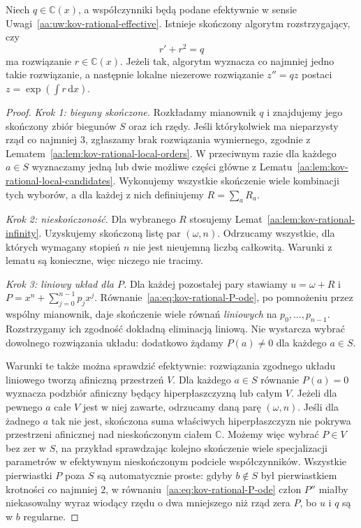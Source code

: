 \begin{twierdzenie}
\label{aa:tw:kov-rational-complete-algorithm}
Niech $q\in\mathbb C(x)$,
a współczynniki będą podane
efektywnie w sensie
Uwagi~\ref{aa:uw:kov-rational-effective}.
Istnieje skończony algorytm
rozstrzygający, czy
\begin{equation}\label{aa:eq:kov-rational-main-riccati}
 r'+r^2=q
\end{equation}
ma rozwiązanie $r\in\mathbb C(x)$.
Jeżeli tak, algorytm
wyznacza co najmniej jedno
takie rozwiązanie, a następnie
lokalne niezerowe rozwiązanie
$z''=qz$ postaci
$z=\exp(\int r\,\mathrm dx)$.
\end{twierdzenie}
\begin{proof}
\emph{Krok 1: bieguny skończone.}
Rozkładamy mianownik $q$
i znajdujemy jego skończony
zbiór biegunów $S$
oraz ich rzędy.
Jeśli którykolwiek ma
nieparzysty rząd co najmniej
$3$, zgłaszamy
brak rozwiązania wymiernego,
zgodnie z
Lematem~\ref{aa:lem:kov-rational-local-orders}.
W przeciwnym razie dla
każdego $a\in S$ wyznaczamy
jedną lub dwie możliwe
części główne z
Lematu~\ref{aa:lem:kov-rational-local-candidates}.
Wykonujemy wszystkie skończenie
wiele kombinacji tych wyborów,
a dla każdej z nich
definiujemy $R=\sum_aR_a$.

\emph{Krok 2: nieskończoność.}
Dla wybranego $R$
stosujemy
Lemat~\ref{aa:lem:kov-rational-infinity}.
Uzyskujemy skończoną listę
par $(\omega,n)$.
Odrzucamy wszystkie,
dla których wymagany
stopień $n$ nie jest
nieujemną liczbą całkowitą.
Warunki z lematu są konieczne,
więc niczego nie tracimy.

\emph{Krok 3: liniowy układ dla $P$.}
Dla każdej pozostałej pary
stawiamy $u=\omega+R$ i
$P=x^n+\sum_{j=0}^{n-1}p_jx^j$.
Równanie~\eqref{aa:eq:kov-rational-P-ode},
po pomnożeniu przez
wspólny mianownik,
daje skończenie wiele równań
\emph{liniowych} na
$p_0,\ldots,p_{n-1}$.
Rozstrzygamy ich zgodność
dokładną eliminacją liniową.
Nie wystarcza wybrać
dowolnego rozwiązania
układu: dodatkowo żądamy
$P(a)\ne0$ dla każdego
$a\in S$.

Warunki te także
można sprawdzić efektywnie:
rozwiązania zgodnego
układu liniowego tworzą
afiniczną przestrzeń $V$.
Dla każdego $a\in S$
równanie $P(a)=0$
wyznacza podzbiór afiniczny
będący hiperpłaszczyzną
lub całym $V$.
Jeżeli dla pewnego $a$
całe $V$ jest w niej zawarte,
odrzucamy daną parę
$(\omega,n)$.
Jeśli dla żadnego $a$
tak nie jest, skończona
suma właściwych
hiperpłaszczyzn nie pokrywa
przestrzeni afinicznej
nad nieskończonym ciałem
$\mathbb C$. Możemy więc
wybrać $P\in V$ bez zer
w $S$, na przykład
sprawdzając kolejno
skończenie wiele
specjalizacji parametrów
w efektywnym nieskończonym
podciele współczynników.
Wszystkie pierwiastki $P$
poza $S$ są automatycznie
proste: gdyby $b\notin S$
był pierwiastkiem krotności
co najmniej $2$,
w równaniu~\eqref{aa:eq:kov-rational-P-ode}
człon $P''$ miałby
niekasowalny wyraz wiodący
rzędu o dwa mniejszego
niż rząd zera $P$,
bo $u$ i $q$ są w $b$
regularne.


\end{proof}
